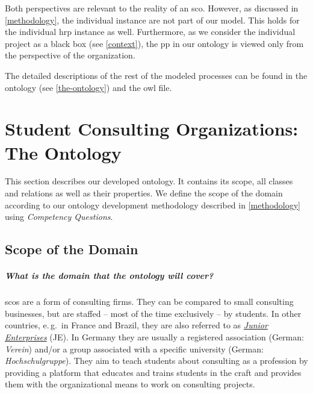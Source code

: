 \documentclass[a4paper, DIV=13, BCOR=0cm]{scrbook}
\newcommand{\eg}{e.\,g.\ }
\begin{document}
Both perspectives are relevant to the reality of an \gls{sco}. However, as discussed in \autoref{methodology}, the individual instance are not part of our model. This holds for the individual \gls{hrp} instance as well. Furthermore, as we consider the individual project as a black box (see \autoref{context}), the \gls{pp} in our ontology is viewed only from the perspective of the organization.

The detailed descriptions of the rest of the modeled processes can be found in the ontology (see \autoref{the-ontology}) and the \gls{owl} file.

\chapter[Student Consulting Organizations: The Ontology \\\textcolor{gray}{
	{\footnotesize \textsl{Declares the ontology in a readable format.}}
}]{Student Consulting Organizations: The Ontology}
\label{the-ontology}
This section describes our developed ontology. It contains its scope, all classes and relations as well as their properties. We define the scope of the domain according to our ontology development methodology described in \autoref{methodology} using \textit{Competency Questions}.

\section{Scope of the Domain }
\label{competency-questions}
\paragraph{What is the domain that the ontology will cover?}
\glspl{sco} are a form of consulting firms.  They can be compared to small consulting businesses, but are staffed -- most of the time exclusively -- by students. In other countries, \eg in France and Brazil, they are also referred to as \href{https://en.wikipedia.org/wiki/Junior_enterprise}{\textit{Junior Enterprises}} (JE). In Germany they are usually a registered association (German: \textit{Verein}) and/or a group associated with a specific university (German: \textit{Hochschulgruppe}). They aim to teach students about consulting as a profession by providing a platform that educates and trains students in the craft and provides them with the organizational means to work on consulting projects.
\end{document}
